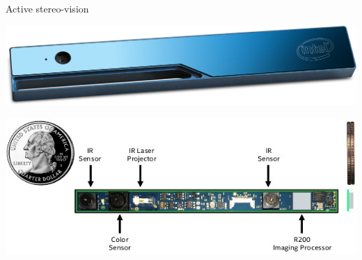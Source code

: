 \documentclass[compress]{beamer}
\begin{document}
\begin{frame}{Active stereo-vision}
    \begin{center}
        \includegraphics[width=0.8\linewidth]{r200}

        \includegraphics[width=0.8\linewidth]{r200_inside}
    \end{center}
\end{frame}
\end{document}
